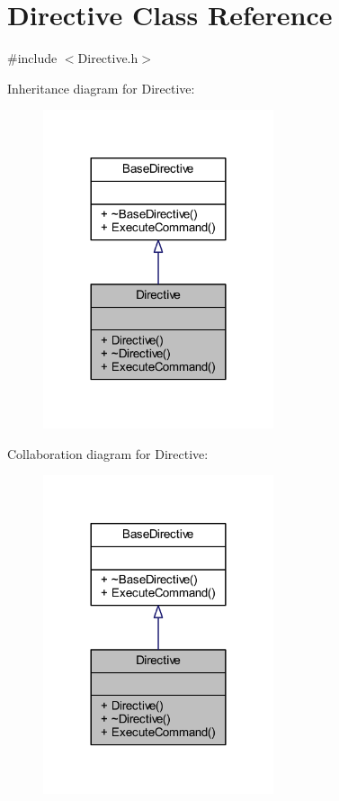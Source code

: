 \hypertarget{class_directive}{}\section{Directive Class Reference}
\label{class_directive}


{\ttfamily \#include $<$Directive.\+h$>$}



Inheritance diagram for Directive\+:
\nopagebreak
\begin{figure}[H]
\begin{center}
\leavevmode
\includegraphics[width=192pt]{class_directive__inherit__graph}
\end{center}
\end{figure}


Collaboration diagram for Directive\+:
\nopagebreak
\begin{figure}[H]
\begin{center}
\leavevmode
\includegraphics[width=192pt]{class_directive__coll__graph}
\end{center}
\end{figure}
